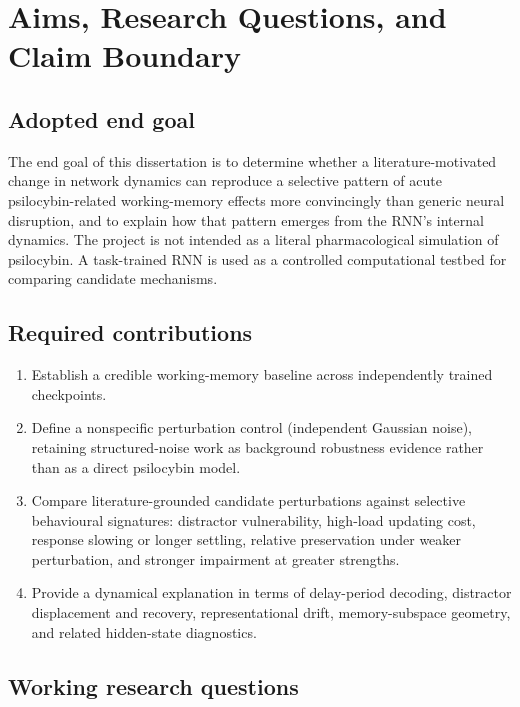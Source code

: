 \section{Aims, Research Questions, and Claim Boundary}
\label{ch:aims}

\subsection{Adopted end goal}

The end goal of this dissertation is to determine whether a
literature-motivated change in network dynamics can reproduce a selective
pattern of acute psilocybin-related working-memory effects more convincingly
than generic neural disruption, and to explain how that pattern emerges from
the RNN's internal dynamics. The project is not intended as a literal
pharmacological simulation of psilocybin. A task-trained RNN is used as a
controlled computational testbed for comparing candidate mechanisms.

\subsection{Required contributions}

\begin{enumerate}[leftmargin=*]
  \item Establish a credible working-memory baseline across independently
        trained checkpoints.
  \item Define a nonspecific perturbation control (independent Gaussian noise),
        retaining structured-noise work as background robustness evidence
        rather than as a direct psilocybin model.
  \item Compare literature-grounded candidate perturbations against selective
        behavioural signatures: distractor vulnerability, high-load updating
        cost, response slowing or longer settling, relative preservation under
        weaker perturbation, and stronger impairment at greater strengths.
  \item Provide a dynamical explanation in terms of delay-period decoding,
        distractor displacement and recovery, representational drift,
        memory-subspace geometry, and related hidden-state diagnostics.
\end{enumerate}

\subsection{Working research questions}


